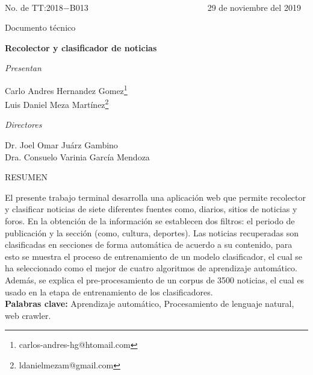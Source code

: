 \ \\[1cm]
No. de TT:2018$-$B013  
$\ \ \ \ \ \ \ \ \ \ \ \ \ \ \ \ \ \ \ \ \ \ \ \ \ \ \ \ \ \ \ \ \ \ \ \ \ \ \ \ \ \ \ \ \ \ \ \ \ \ \ \ \ \ \ \ \ \ \ \ \ $
29 de noviembre del 2019

\begin{center}

  \begin{large}
    Documento técnico\\[1cm]
  \end{large}

  \textbf{ \LARGE{R}\LARGE{ecolector} \LARGE{y} \LARGE{clasificador} \LARGE{de}  
  \LARGE{noticias}}\\[1cm]

  \begin{large}
    \textit{Presentan}\\[0.5cm]
  \end{large}

  \large{Carlo Andres Hernandez Gomez}\footnote{carlos-andres-hg@htomail.com}\\
  \large{Luis Daniel Meza Martínez}\footnote{ldanielmezam@gmail.com}\\[0.5cm]

  \begin{large}
    \textit{Directores}\\[0.5cm]
  \end{large}

  \large{Dr. Joel Omar Juárz Gambino }\\
  \large{Dra. Consuelo Varinia García Mendoza }\\[0.5cm]

  \begin{large}
   RESUMEN\\[0.5cm]
  \end{large}


\end{center}

El presente trabajo terminal desarrolla una aplicación web que permite recolector y clasificar noticias de siete diferentes fuentes como, diarios, sitios de noticias y foros. En la obtención de la información se establecen dos filtros: el periodo de publicación y la sección (como, cultura, deportes). Las noticias recuperadas son clasificadas en secciones de forma automática de acuerdo a su contenido, para esto se muestra el proceso de entrenamiento de un modelo clasificador, el cual se ha seleccionado como el mejor de cuatro algoritmos de aprendizaje automático. Además, se explica el pre-procesamiento de un corpus de 3500 noticias, el cual es usado en la etapa de entrenamiento de los clasificadores.\\

\textbf{Palabras clave:} Aprendizaje automático, Procesamiento de lenguaje natural, web crawler.
